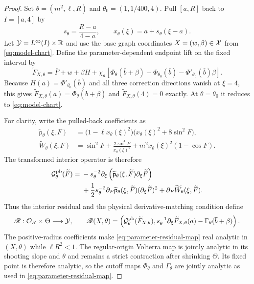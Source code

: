 \begin{proof}
Set $\theta=(m^2,\ell,R)$ and $\theta_0=(1,1/400,4)$.  Pull $[a,R]$
back to $I=[a,4]$ by
\[
 s_\theta=\frac{R-a}{4-a},
 \qquad x_\theta(\xi)=a+s_\theta(\xi-a).
\]
Let $\mathcal Y=L^\infty(I)\times\mathbb R$ and use the base graph coordinates
$X=(w,\beta)\in\mathcal X$ from \eqref{eq:model-chart}.  Define the
parameter-dependent endpoint lift on the fixed interval by
\begin{equation}
 \widetilde F_{X,\theta}
 =\overline F+w+\beta H
  +\chi_a\left[
    \Phi_\theta(\overline b+\beta)-\Phi_{\theta_0}(\overline b)
    -\Phi'_{\theta_0}(\overline b)\beta\right].
 \label{eq:parameter-endpoint-chart}
\end{equation}
Because $H(a)=\Phi'_{\theta_0}(\overline b)$ and all three correction
directions vanish at $\xi=4$, this gives
\(\widetilde F_{X,\theta}(a)=\Phi_\theta(\overline b+\beta)\) and
\(\widetilde F_{X,\theta}(4)=0\) exactly.  At $\theta=\theta_0$ it reduces
to \eqref{eq:model-chart}.

For clarity, write the pulled-back coefficients as
\begin{align*}
 \widetilde{\mathsf p}_\theta(\xi,F)
 &=\bigl(1-\ell x_\theta(\xi)^2\bigr)
   \bigl(x_\theta(\xi)^2+8\sin^2F\bigr),\\
 \widetilde W_\theta(\xi,F)
 &=\sin^2F+\frac{2\sin^4F}{x_\theta(\xi)^2}
   +m^2x_\theta(\xi)^2(1-\cos F).
\end{align*}
The transformed interior operator is therefore
\begin{align}
 \mathcal G^{\rm pb}_\theta(\widetilde F)
 ={}&-s_\theta^{-2}\partial_\xi
       \left(\widetilde{\mathsf p}_\theta(\xi,\widetilde F)
             \partial_\xi\widetilde F\right)
 \notag\\
 &+\frac12s_\theta^{-2}
       \partial_F\widetilde{\mathsf p}_\theta(\xi,\widetilde F)
       (\partial_\xi\widetilde F)^2
   +\partial_F\widetilde W_\theta(\xi,\widetilde F).
 \label{eq:parameter-pulled-back-operator}
\end{align}
Thus the interior residual and the physical derivative-matching condition
define
\begin{equation}
 \mathscr R:\mathcal O_{\mathcal X}\times\Theta\longrightarrow\mathcal Y,
 \qquad
 \mathscr R(X,\theta)=
 \left(\mathcal G^{\rm pb}_\theta(\widetilde F_{X,\theta}),
       s_\theta^{-1}\partial_\xi\widetilde F_{X,\theta}(a)
       -\Gamma_\theta(\overline b+\beta)\right).
 \label{eq:parameter-residual-map}
\end{equation}
The positive-radius coefficients make \eqref{eq:parameter-residual-map} real
analytic in $(X,\theta)$ while $\ell R^2<1$.  The regular-origin Volterra map is
jointly analytic in its shooting slope and $\theta$ and remains a strict
contraction after shrinking $\Theta$.  Its fixed point is therefore analytic,
so the cutoff maps $\Phi_\theta$ and $\Gamma_\theta$ are jointly analytic as
used in \eqref{eq:parameter-residual-map}.


\end{proof}
